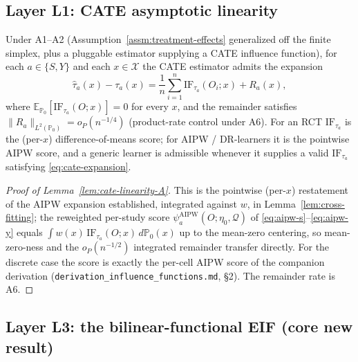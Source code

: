 \subsection{Layer L1: CATE asymptotic linearity}

\begin{lemma}
\label{lem:cate-linearity-A}
Under A1--A2 (Assumption~\ref{assm:treatment-effects} generalized off the finite simplex, plus
a pluggable estimator supplying a CATE influence function), for each $a\in\{S,Y\}$ and each
$x\in\mathcal{X}$ the CATE estimator admits the expansion
\begin{equation}
\hat{\tau}_a(x) - \tau_a(x)
  = \frac{1}{n}\sum_{i=1}^n \mathrm{IF}_{\tau_a}(O_i;x) + R_a(x),
\label{eq:cate-expansion}
\end{equation}
where $\mathbb{E}_{\mathbb{P}_0}[\mathrm{IF}_{\tau_a}(O;x)]=0$ for every $x$, and the remainder
satisfies $\|R_a\|_{L^2(\mathbb{P}_0)}=o_P(n^{-1/4})$ (product-rate control under A6).
For an RCT $\mathrm{IF}_{\tau_a}$ is the (per-$x$) difference-of-means score; for AIPW /
DR-learners it is the pointwise AIPW score, and a generic learner is admissible whenever
it supplies a valid $\mathrm{IF}_{\tau_a}$ satisfying \eqref{eq:cate-expansion}.
\end{lemma}

\begin{proof}[Proof of Lemma~\ref{lem:cate-linearity-A}]
This is the pointwise (per-$x$) restatement of the AIPW expansion established, integrated
against $w$, in Lemma~\ref{lem:cross-fitting}; the reweighted per-study score
$\psi_a^{\text{AIPW}}(O;\eta_0,\mathcal{Q})$ of \eqref{eq:aipw-s}--\eqref{eq:aipw-y} equals
$\int w(x)\,\mathrm{IF}_{\tau_a}(O;x)\,d\mathbb{P}_0(x)$ up to the mean-zero centering, so
mean-zero-ness and the $o_P(n^{-1/2})$ integrated remainder transfer directly. For the discrete
case the score is exactly the per-cell AIPW score of the companion derivation
(\texttt{derivation\_influence\_functions.md}, \S2). The remainder rate is A6.
\end{proof}

\subsection{Layer L3: the bilinear-functional EIF (core new result)}

